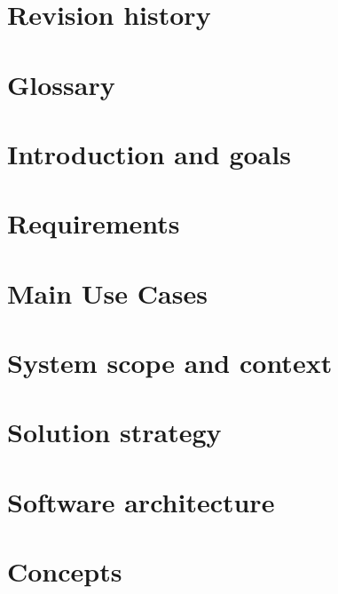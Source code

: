 \documentclass[11pt, oneside]{book}
\begin{document}


\frontmatter

\chapter{Revision history}
\label{chp:rev_his}




\chapter{Glossary}
\label{chp:glos}


\mainmatter

\chapter{Introduction and goals}
\label{chp:intro}


\chapter{Requirements}
\label{chp:requirements}


\chapter{Main Use Cases}
\label{chp:usecases}


\chapter{System scope and context}
\label{chp:syst_context}


\chapter{Solution strategy}
\label{chp:sol_strategy}


\chapter{Software architecture}
\label{chp:soft_arch}


\chapter{Concepts}
\label{chp:concepts}

\end{document}
